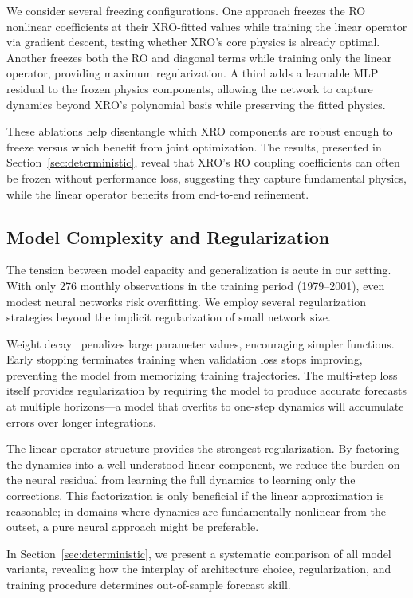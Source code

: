 We consider several freezing configurations. One approach freezes the RO nonlinear coefficients at their XRO-fitted values while training the linear operator via gradient descent, testing whether XRO's core physics is already optimal. Another freezes both the RO and diagonal terms while training only the linear operator, providing maximum regularization. A third adds a learnable MLP residual to the frozen physics components, allowing the network to capture dynamics beyond XRO's polynomial basis while preserving the fitted physics.

These ablations help disentangle which XRO components are robust enough to freeze versus which benefit from joint optimization. The results, presented in Section~\ref{sec:deterministic}, reveal that XRO's RO coupling coefficients can often be frozen without performance loss, suggesting they capture fundamental physics, while the linear operator benefits from end-to-end refinement.

\subsection{Model Complexity and Regularization}

The tension between model capacity and generalization is acute in our setting. With only 276 monthly observations in the training period (1979--2001), even modest neural networks risk overfitting. We employ several regularization strategies beyond the implicit regularization of small network size.

Weight decay~\cite{krogh1992simple} penalizes large parameter values, encouraging simpler functions. Early stopping terminates training when validation loss stops improving, preventing the model from memorizing training trajectories. The multi-step loss itself provides regularization by requiring the model to produce accurate forecasts at multiple horizons---a model that overfits to one-step dynamics will accumulate errors over longer integrations.

The linear operator structure provides the strongest regularization. By factoring the dynamics into a well-understood linear component, we reduce the burden on the neural residual from learning the full dynamics to learning only the corrections. This factorization is only beneficial if the linear approximation is reasonable; in domains where dynamics are fundamentally nonlinear from the outset, a pure neural approach might be preferable.

In Section~\ref{sec:deterministic}, we present a systematic comparison of all model variants, revealing how the interplay of architecture choice, regularization, and training procedure determines out-of-sample forecast skill.
